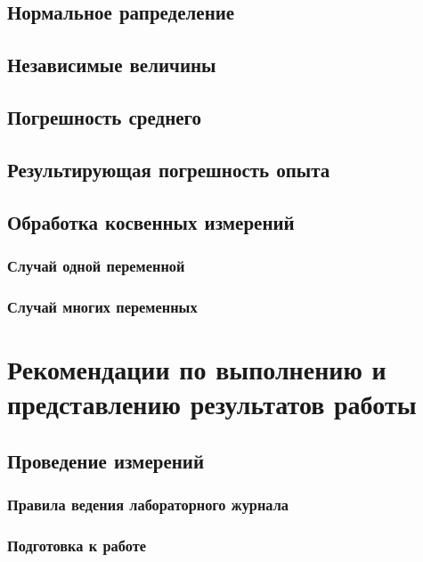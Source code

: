 \documentclass[12pt]{article}
\begin{document}
    \subsection{Нормальное рапределение}

    \subsection{Независимые величины}

    \subsection{Погрешность среднего}

    \subsection{Результирующая погрешность опыта}

    \subsection{Обработка косвенных измерений}

      \subsubsection{Случай одной переменной}

      \subsubsection{Случай многих переменных}

  \section{Рекомендации по выполнению и представлению результатов работы}

    \subsection{Проведение измерений}

      \subsubsection{Правила ведения лабораторного журнала}

      \subsubsection{Подготовка к работе}
\end{document}
